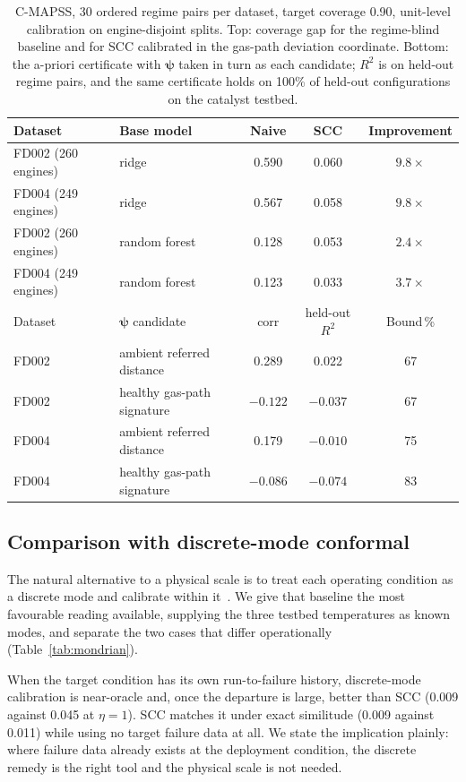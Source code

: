 \documentclass[review,times]{elsarticle}
\theoremstyle{definition}
\theoremstyle{remark}
\begin{document}
\begin{table}[t]\centering\footnotesize
\setlength{\tabcolsep}{7pt}\renewcommand{\arraystretch}{1.2}
\caption{C-MAPSS, 30 ordered regime pairs per dataset, target coverage 0.90, unit-level calibration
on engine-disjoint splits. Top: coverage gap for the regime-blind baseline and for SCC calibrated in
the gas-path deviation coordinate. Bottom: the a-priori certificate with $\boldsymbol\psi$ taken in
turn as each candidate; $R^2$ is on held-out regime pairs, and the same certificate holds on 100\%
of held-out configurations on the catalyst testbed.}\label{tab:cmapss}
\begin{tabular}{@{}llccc@{}}\toprule
Dataset & Base model & Naive & SCC & Improvement \\\midrule
FD002 (260 engines) & ridge & 0.590 & 0.060 & $9.8\times$ \\
FD004 (249 engines) & ridge & 0.567 & 0.058 & $9.8\times$ \\
FD002 (260 engines) & random forest & 0.128 & 0.053 & $2.4\times$ \\
FD004 (249 engines) & random forest & 0.123 & 0.033 & $3.7\times$ \\\midrule
Dataset & $\boldsymbol\psi$ candidate & corr & held-out $R^2$ & Bound\,\% \\\midrule
FD002 & ambient referred distance & 0.289 & 0.022 & 67 \\
FD002 & healthy gas-path signature & $-0.122$ & $-0.037$ & 67 \\
FD004 & ambient referred distance & 0.179 & $-0.010$ & 75 \\
FD004 & healthy gas-path signature & $-0.086$ & $-0.074$ & 83 \\\bottomrule
\end{tabular}
\end{table}

\subsection{Comparison with discrete-mode conformal}\label{sec:res-mondrian}
The natural alternative to a physical scale is to treat each operating condition as a discrete mode
and calibrate within it~\cite{javanmardi2023conformal}. We give that baseline the most favourable
reading available, supplying the three testbed temperatures as known modes, and separate the two
cases that differ operationally (Table~\ref{tab:mondrian}).

When the target condition has its own run-to-failure history, discrete-mode calibration is
near-oracle and, once the departure is large, better than SCC (0.009 against 0.045 at $\eta=1$). SCC
matches it under exact similitude (0.009 against 0.011) while using no target failure data at all.
We state the implication plainly: where failure data already exists at the deployment condition, the
discrete remedy is the right tool and the physical scale is not needed.
\end{document}
